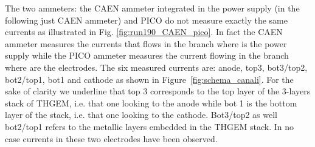 \documentclass[a4paper, 11 pt]{report}
\begin{document}
The two ammeters: the CAEN ammeter integrated in the power supply (in the following just CAEN 
ammeter) and PICO do not measure exactly the same currents as illustrated in Fig. 
\ref{fig:run190_CAEN_pico}. In fact the 
CAEN ammeter measures the currents that flows in the branch where is the power supply while the 
PICO ammeter measures the current flowing in the branch where are the electrodes. The six measured
currents are: anode, top3, bot3/top2, bot2/top1, bot1 and cathode as shown in 
Figure~\ref{fig:schema_canali}. For the sake of clarity we underline that top 3 corresponds to the 
top layer of the 3-layers stack of THGEM, i.e. that one looking to the anode while bot 1 is the 
bottom layer of the stack, i.e. that one looking to the cathode. Bot3/top2 as well bot2/top1 
refers to the metallic layers embedded in the THGEM stack. In no case currents in these two 
electrodes have been observed.\\
\end{document}
